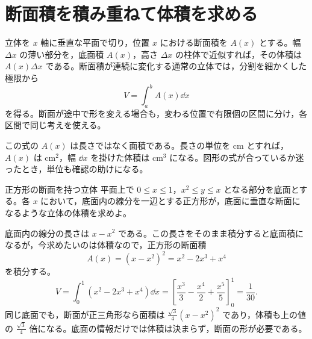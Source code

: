 \section{断面積を積み重ねて体積を求める}\label{節:断面積と体積}

立体を $x$ 軸に垂直な平面で切り，位置 $x$ における断面積を $A(x)$ とする。幅 $\Delta x$ の薄い部分を，底面積 $A(x)$，高さ $\Delta x$ の柱体で近似すれば，その体積は $A(x)\Delta x$ である。断面積が連続に変化する通常の立体では，分割を細かくした極限から
\begin{equation}\label{式:断面積の体積}
V=\int_a^b A(x)\dd x
\end{equation}
を得る。断面が途中で形を変える場合も，変わる位置で有限個の区間に分け，各区間で同じ考えを使える。

この式の $A(x)$ は長さではなく面積である。長さの単位を $\mathrm{cm}$ とすれば，$A(x)$ は $\mathrm{cm}^2$，幅 $\dd x$ を掛けた体積は $\mathrm{cm}^3$ になる。図形の式が合っているか迷ったとき，単位も確認の助けになる。

\begin{example}{正方形の断面を持つ立体}
平面上で $0\leq x\leq1$，$x^2\leq y\leq x$ となる部分を底面とする。各 $x$ において，底面内の線分を一辺とする正方形が，底面に垂直な断面になるような立体の体積を求めよ。
\end{example}

底面内の線分の長さは $x-x^2$ である。この長さをそのまま積分すると底面積になるが，今求めたいのは体積なので，正方形の断面積
\[
A(x)=(x-x^2)^2=x^2-2x^3+x^4
\]
を積分する。
\[
V=\int_0^1(x^2-2x^3+x^4)\dd x
 =\left[\frac{x^3}{3}-\frac{x^4}{2}+\frac{x^5}{5}\right]_0^1
 =\frac1{30}.
\]
同じ底面でも，断面が正三角形なら面積は $\frac{\sqrt3}{4}(x-x^2)^2$ であり，体積も上の値の $\frac{\sqrt3}{4}$ 倍になる。底面の情報だけでは体積は決まらず，断面の形が必要である。


